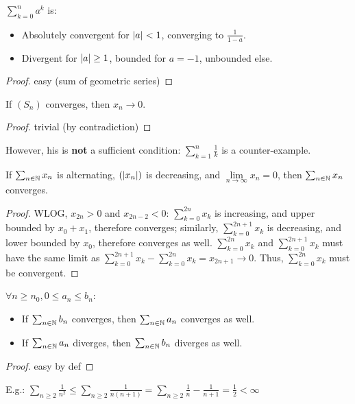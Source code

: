 \begin{property}
	$\sum_{k=0}^n a^k$ is:
	\begin{itemize}
		\item Absolutely convergent for $| a | < 1$, converging to $\frac{1}{1-a}$.
		\item Divergent for $| a | \geq 1$, bounded for $a=-1$, unbounded else.
	\end{itemize}
\end{property}
\begin{proof}
	easy (sum of geometric series)
\end{proof}

\begin{property}
	If $(S_n)$ converges, then $x_n \to 0$.
\end{property}
\begin{proof}
	trivial (by contradiction)
\end{proof}
However, his is \textbf{not} a sufficient condition: $\sum_{k=1}^n \frac{1}{k}$ is a counter-example.

\begin{property}
	If $\sum_{n \in \mathbb{N}} x_n$ is alternating, $(| x_n |)$ is decreasing, and $\lim\limits_{n \to \infty} x_n = 0$, then $\sum_{n \in \mathbb{N}} x_n$ converges.
\end{property}
\begin{proof}
	WLOG, $x_{2n}>0$ and $x_{2n-2}<0$:
	$\sum_{k=0}^{2n} x_k$ is increasing, and upper bounded by $x_0+x_1$, therefore converges;
	similarly, $\sum_{k=0}^{2n+1} x_k$ is decreasing, and lower bounded by $x_0$, therefore converges as well.
	$\sum_{k=0}^{2n} x_k$ and $\sum_{k=0}^{2n+1} x_k$ must have the same limit as $\sum_{k=0}^{2n+1} x_k - \sum_{k=0}^{2n} x_k = x_{2n+1} \to 0$.
	Thus, $\sum_{k=0}^{2n} x_k$ must be convergent.
\end{proof}

\begin{property}
	$\forall n \geq n_0, 0 \leq a_n \leq b_n$:
	\begin{itemize}
		\item If $\sum_{n \in \mathbb{N}} b_n$ converges, then $\sum_{n \in \mathbb{N}} a_n$ converges as well.
		\item If $\sum_{n \in \mathbb{N}} a_n$ diverges, then $\sum_{n \in \mathbb{N}} b_n$ diverges as well.
	\end{itemize}
\end{property}
\begin{proof}
	easy by def
\end{proof}
E.g.: $\sum_{n \geq 2} \frac{1}{n^2}
\leq \sum_{n \geq 2} \frac{1}{n(n+1)}
= \sum_{n \geq 2} \frac{1}{n}-\frac{1}{n+1}
= \frac{1}{2} < \infty$

